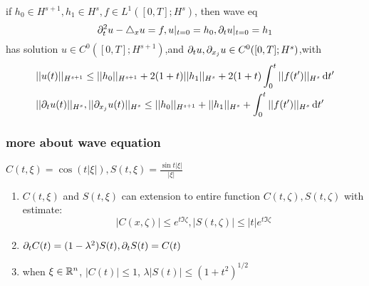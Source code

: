 \documentclass[../main]{subfiles}
\begin{document}
\begin{thm}
    if $h_0\in H^{s+1},h_1\in H^s,f\in L^1([0,T];H^s)$, then wave eq
    \begin{equation}
        \partial_t^2 u -\triangle_x u=f, u|_{t=0}=h_0, \partial_t u|_{t=0}=h_1
    \end{equation}
    has solution $u\in C^0([0,T];H^{s+1})$,and $\partial_t u,\partial_{x_j} u\in C^0([0,T];H^s)$,with
    \begin{align}
        &||u(t)||_{H^{s+1}}\le ||h_0||_{H^{s+1}}+2(1+t)||h_1||_{H^s}+2(1+t)\int_0^t||f(t')||_{H^s}\,\mathrm{d}t'\\
        &||\partial_t u(t)||_{H^s},||\partial_{x_j} u(t)||_{H^s} \le ||h_0||_{H^{s+1}}+||h_1||_{H^s}+\int_0^t||f(t')||_{H^s}\,\mathrm{d}t'
    \end{align}
\end{thm}
\newpage

\subsubsection{more about wave equation}
\begin{nota}
    $C(t,\xi)=\cos(t|\xi|),S(t,\xi)=\frac{\sin{t |\xi|}}{|\xi|}$
\end{nota}

\begin{thm}
    \begin{enumerate}
        \item $C(t,\xi)$ and $S(t,\xi)$ can extension to entire function $C(t,\zeta),S(t,\zeta)$ with estimate:\begin{equation}
            |C(x,\zeta)|\le e^{t\Im{\zeta}},|S(t,\zeta)|\le |t|e^{t\Im{\zeta}}
        \end{equation}
        \item $\partial_t C(t)= (1-\lambda^2)S(t),\partial_t S(t)=C(t)$
        \item when $\xi\in \mathbb{R}^n$, $|C(t)|\le 1$, $\lambda|S(t)|\le (1+t^2)^{1/2}$
        \end{enumerate}
\end{thm}
\vspace{5cm}
\end{document}
